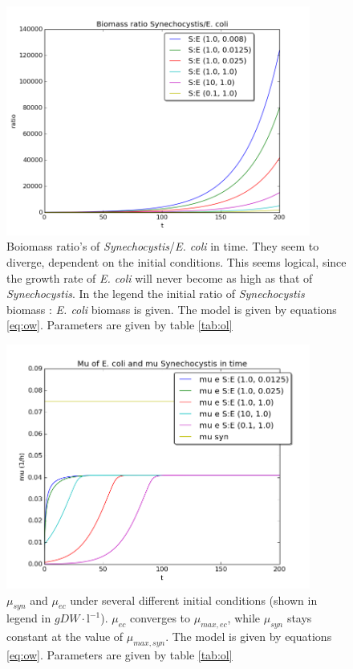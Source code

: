 \documentclass[10pt]{report}
\begin{document}
\begin{figure}[!ht]
 \begin{center}  
     \includegraphics[width=10cm]{independent_flask_ratios_low_mumaxe.png}
     \caption{Boiomass ratio's of \textit{Synechocystis}/\textit{E. coli} in time. They seem to diverge, dependent on the initial conditions. This seems logical, since the growth rate of \textit{E. coli} will never become as high as that of \textit{Synechocystis}. In the legend the initial ratio of \textit{Synechocystis} biomass : \textit{E. coli} biomass is given. The model is given by equations \ref{eq:ow}. Parameters are given by table \ref{tab:ol}}
    \label{fig:false}
    \end{center}
\end{figure}


\begin{figure}[!ht]
 \begin{center}  
     \includegraphics[width=10cm]{independent_flask_mus_low_mumaxe.png}
     \caption{$\mu_{syn}$ and $\mu_{ec}$ under several different initial conditions (shown in legend in $gDW\cdot \text{l}^{-1}$). $\mu_{ec}$ converges to $\mu_{max,ec}$, while $\mu_{syn}$ stays constant at the value of $\mu_{max,syn}$. The model is given by equations \ref{eq:ow}. Parameters are given by table \ref{tab:ol}}
    \label{fig:false2}
    \end{center}
\end{figure}
\end{document}
